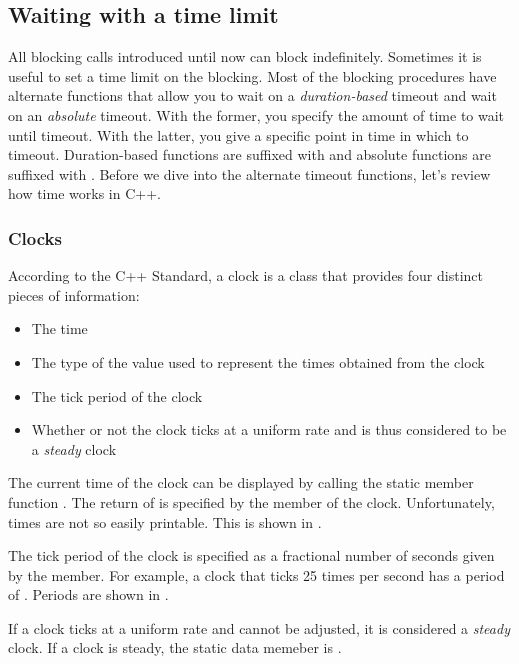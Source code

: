 \subsection{Waiting with a time limit}
All blocking calls introduced until now can block indefinitely. Sometimes it is useful to set a time limit on the blocking. Most of the blocking procedures have alternate functions that allow you to wait on a \emph{duration-based} timeout and wait on an \emph{absolute} timeout. With the former, you specify the amount of time to wait until timeout. With the latter, you give a specific point in time in which to timeout. Duration-based functions are suffixed with  and absolute functions are suffixed with . Before we dive into the alternate timeout functions, let's review how time works in C++.

\subsubsection{Clocks}
According to the C++ Standard, a clock is a class that provides four distinct pieces of information:
\begin{itemize}
  \item The time 
  \item The type of the value used to represent the times obtained from the clock
  \item The tick period of the clock
  \item Whether or not the clock ticks at a uniform rate and is thus considered to be a \emph{steady} clock
\end{itemize}

The current time of the clock can be displayed by calling the static member function . The return of  is specified by the  member of the clock. Unfortunately, times are not so easily printable. This is shown in .


The tick period of the clock is specified as a fractional number of seconds given by the  member. For example, a clock that ticks 25 times per second has a period of . Periods are shown in .


If a clock ticks at a uniform rate and cannot be adjusted, it is considered a \emph{steady} clock. If a clock is steady, the  static data memeber is .

